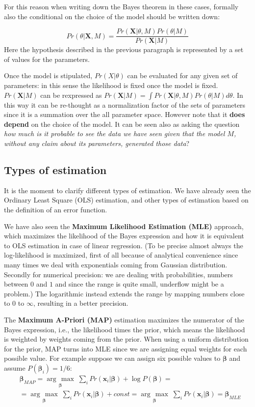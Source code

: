 \documentclass[12pt, letterpaper]{article}
\theoremstyle{definition}
\newcommand{\X}{\mathrm{\mathbf{X}}}
\newcommand{\be}{\mathbf{\beta}}
\newcommand{\x}{\mathbf{x}}
\newcommand{\argmax}[1]{\underset{#1}{\operatorname{arg}\,\operatorname{max}}\;}
\begin{document}
For this reason when writing down the Bayes theorem in these cases, formally also the conditional on the choice of the model should be written down:

\begin{equation}
Pr(\theta|\X,M) = \frac{Pr(\X|\theta,M)Pr(\theta|M)}{Pr(\X|M)}
\end{equation}
Here the hypothesis described in the previous paragraph is represented by a set of values for the parameters.

Once the model is stipulated, $Pr(X|\theta)$ can be evaluated for any given set of parameters: in this sense the likelihood is fixed once the model is fixed.
$Pr(\X|M)$ can be rexpressed as $Pr(\X|M) =\int Pr(\X|\theta,M)Pr(\theta|M)d\theta$. In this way it can be re-thought as a normalization factor of the sets of parameters since it is a summation over the all parameter space. However note that it \textbf{does depend} on the choice of the model. It can be seen also as asking the question \textit{how much is it probable to see the data we have seen given that the model $M$, without any claim about its parameters, generated those data}?

\subsection{Types of estimation}
It is the moment to clarify different types of estimation. We have already seen the Ordinary Least Square (OLS) estimation, and other types of estimation based on the definition of an error function.

We have also seen the \textbf{Maximum Likelihood Estimation (MLE)} approach, which maximizes the likelihood of the Bayes expression and how it is equivalent to OLS estimation in case of linear regression. (To be precise almost always the log-likelihood is maximized, first of all because of analytical convenience since many times we deal with exponentials coming from Gaussian distribution. Secondly for numerical precision: we are dealing with probabilities, numbers between $0$ and $1$ and since the range is quite small, underflow might be a problem.) The logarithmic instead extends the range by mapping numbers close to $0$ to $\infty$, resulting in a better precision.

The \textbf{Maximum A-Priori (MAP)} estimation maximizes the numerator of the Bayes expression, i.e., the likelihood times the prior, which means the likelihood is weighted by weights coming from the prior. When using a uniform distribution for the prior, MAP turns into MLE since we are assigning equal weights for each possible value. For example suppose we can assign six possible values to $\be$ and assume $P(\be_i)=1/6$:
\begin{equation}
\begin{aligned}
&\be_{MAP} = \argmax{\be}{\sum_i Pr(\x_i|\be) + \log P(\be)} =
\\&= \argmax{\be}{\sum_i Pr(\x_i|\be) +const}=\argmax{\be}{\sum_i Pr(\x_i|\be)} = \be_{MLE}
\end{aligned}
\end{equation}
\end{document}

